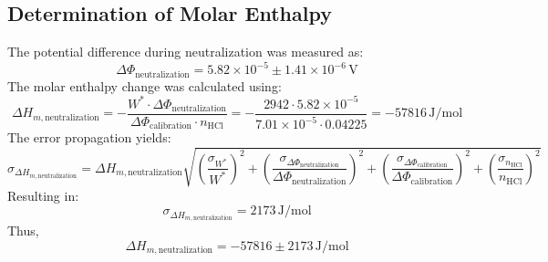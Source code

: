 \documentclass[a4paper,12pt]{article}
\begin{document}
\subsection{Determination of Molar Enthalpy}
The potential difference during neutralization was measured as:
\[
\Delta \Phi_{\text{neutralization}} = 5.82 \times 10^{-5} \pm 1.41 \times 10^{-6} \, \text{V}
\]
The molar enthalpy change was calculated using:
\[
\Delta H_{m, \text{neutralization}} = -\frac{W^* \cdot \Delta \Phi_{\text{neutralization}}}{\Delta \Phi_{\text{calibration}} \cdot n_{\text{HCl}}} = -\frac{2942 \cdot 5.82 \times 10^{-5}}{7.01 \times 10^{-5} \cdot 0.04225} = -57816 \, \text{J/mol}
\]
The error propagation yields:
\[
\sigma_{\Delta H_{m, \text{neutralization}}} = \Delta H_{m, \text{neutralization}} \sqrt{\left(\frac{\sigma_{W^*}}{W^*}\right)^2 + \left(\frac{\sigma_{\Delta \Phi_{\text{neutralization}}}}{\Delta \Phi_{\text{neutralization}}}\right)^2 + \left(\frac{\sigma_{\Delta \Phi_{\text{calibration}}}}{\Delta \Phi_{\text{calibration}}}\right)^2 + \left(\frac{\sigma_{n_{\text{HCl}}}}{n_{\text{HCl}}}\right)^2}
\]
Resulting in:
\[
\sigma_{\Delta H_{m, \text{neutralization}}} = 2173 \, \text{J/mol}
\]
Thus,
\[
\Delta H_{m, \text{neutralization}} = -57816 \pm 2173 \, \text{J/mol}
\]
\end{document}
